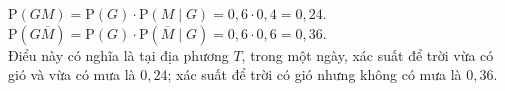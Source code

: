 \begin{vd}
{\begin{listEX}
\begin{center}
	\end{center}
	\item $\mathrm{P}(G M)=\mathrm{P}(G) \cdot \mathrm{P}(M \mid G)=0{,}6 \cdot 0{,}4=0{,}24 $.\\
	$\mathrm{P}(G \overline{M})=\mathrm{P}(G) \cdot \mathrm{P}(\overline{M} \mid G)=0{,}6 \cdot 0{,}6=0{,}36$.\\
	Điểu này có nghĩa là tại địa phương $T$, trong một ngày, xác suất để trời vừa có gió và vừa có mưa là $0{,}24$; xác suất để trời có gió nhưng không có mưa là $0{,}36$.
	\end{listEX}
	}
\end{vd}

